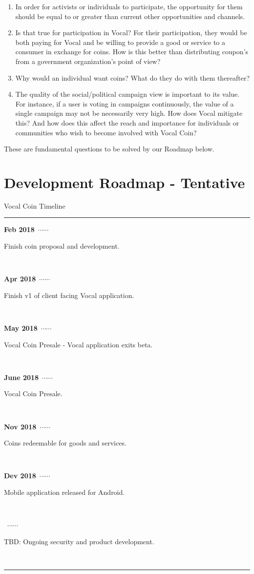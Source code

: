 \documentclass[conference]{IEEEtran}
\begin{document}
    \begin{enumerate}
      \item In order for activists or individuals to participate, the opportunity for them should be equal to or greater than current other opportunities and channels.
      \item Is that true for participation in Vocal? For their participation, they would be both paying for Vocal and be willing to provide a good or service to a consumer in exchange for coins. How is this better than distributing coupon’s from a government organization’s point of view?
      \item Why would an individual want coins? What do they do with them thereafter?
      \item The quality of the social/political campaign view is important to its value. For instance, if a user is voting in campaigns continuously, the value of a single campaign may not be necessarily very high. How does Vocal mitigate this? And how does this affect the reach and importance for individuals or communities who wish to become involved with Vocal Coin?
    \end{enumerate}

    These are fundamental questions to be solved by our Roadmap below.
    
    \section{Development Roadmap - Tentative}


    \newcommand\ytl[2]{
    \parbox[b]{8em}{\hfill{\color{cyan}\bfseries\sffamily #1}~$\cdots\cdots$~}\makebox[0pt][c]{$\bullet$}\vrule\quad \parbox[c]{3cm}{\vspace{7pt}\color{red!40!black!80}\raggedright\sffamily #2.\\[7pt]}\\[-3pt]}
    \begin{table}
    \caption{Vocal Coin Timeline}
    \centering
    \begin{minipage}[t]{\linewidth}
    \color{gray}
    \rule{\linewidth}{1pt}
    \ytl{Feb 2018}{Finish coin proposal and development}
    \ytl{Apr 2018}{Finish v1 of client facing Vocal application}
    \ytl{May 2018}{Vocal Coin Presale - Vocal application exits beta}
    \ytl{June 2018}{Vocal Coin Presale}
    \ytl{Nov 2018}{Coins redeemable for goods and services}
    \ytl{Dev 2018}{Mobile application released for Android}
    \ytl{2019}{TBD: Ongoing security and product development}
    \bigskip
    \rule{\linewidth}{1pt}%
    \end{minipage}%
    \end{table}
\end{document}
